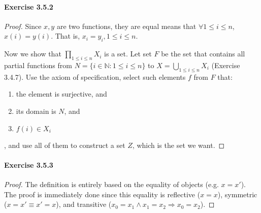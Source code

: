 \paragraph{Exercise 3.5.2} \label{exercise3.5.2}
\begin{proof}
Since $x,y$ are two functions, they are equal means that $\forall 1\leq i \leq n$, $x(i) = y(i)$. That 
is, $x_i = y_i, 1\leq i \leq n$.

Now we show that $\displaystyle \prod_{1\leq i\leq n}X_i$ is a set. Let set $F$ be the set that contains 
all partial functions from $N = \{i \in \mathbb{N}:1\leq i\leq n\}$ to 
$\displaystyle X = \bigcup_{1\leq i\leq n}X_i$ (Exercise 3.4.7). Use the axiom of specification, select 
such elements $f$ from $F$ that:
\begin{enumerate}
\item the element is surjective, and
\item its domain is $N$, and 
\item $f(i) \in X_i$
\end{enumerate}, 
and use all of them to construct a set $Z$, which is the set we want.
\end{proof}

\paragraph{Exercise 3.5.3} \label{exercise3.5.3}
\begin{proof}
The definition is entirely based on the equality of objects (e.g. $x = x'$). The proof is immediately 
done since this equality is reflective ($x = x$), symmetric ($x = x' \equiv x' = x$), and transitive 
($x_0 = x_1 \wedge x_1 = x_2 \Longrightarrow x_0 = x_2$).
\end{proof}

